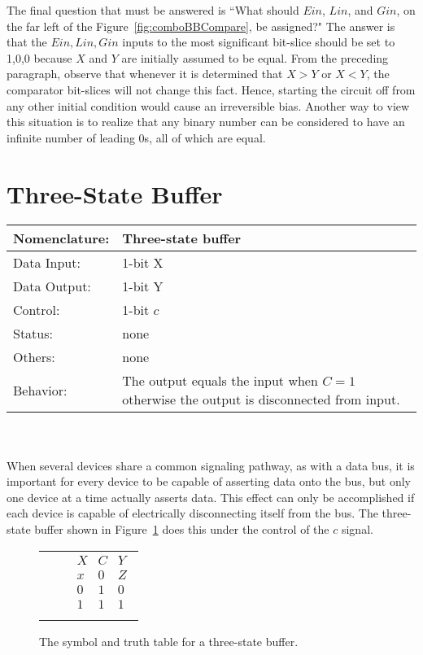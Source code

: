 The final question that must be answered is ``What should $Ein$, $Lin$,
and $Gin$, on the far left of the Figure~\ref{fig:comboBBCompare}, be assigned?"
The answer is that the $Ein, Lin,Gin$ inputs to the most significant bit-slice
should be set to 1,0,0 because $X$ and $Y$ are initially assumed to be equal.
From the preceding paragraph, observe that whenever it is determined
that $X>Y$ or $X<Y$, the comparator bit-slices will not change this 
fact.  Hence, starting the circuit off from any other initial condition
would cause an irreversible bias.  Another way to view this situation
is to realize that any binary number can be considered to have an infinite 
number of leading 0s, all of which are equal.

\section{Three-State Buffer}
\begin{tabular}{|l|p{3.5in}|} \hline
Nomenclature:  & Three-state buffer	\\ \hline
Data Input:    & 1-bit X		\\ \hline
Data Output:   & 1-bit Y		\\ \hline
Control:       & 1-bit $c$              \\ \hline
Status:        & none			\\ \hline
Others:        & none			\\ \hline
Behavior:      & The output equals the input when 
		$C=1$ otherwise the output is 
		disconnected from input. \\ \hline                                                                               
\end{tabular}
\label{page:tsb}
\\ \\
When several devices share a common signaling pathway, as with
a data bus, it is important for every device to be capable of 
asserting data onto the bus, but only one device at a time
actually asserts data.  This effect can only be accomplished if each
device is capable of electrically disconnecting itself from the
bus.  The three-state buffer shown in Figure~\ref{fig:comboBBtsb} does
this under the control of the $c$ signal.
                                                                                
\begin{figure}[ht]
\begin{tabular}[b]{p{1.0in}p{0.5in}l}
\includegraphics[10mm,10mm][12mm,12mm]{tsb} & &
                                                                                
$\begin{array}{c|c||c}
X & C & Y \\ \hline
x & 0 & Z \\ \hline
0 & 1 & 0 \\ \hline
1 & 1 & 1 \\
\end{array}$
\end{tabular}
\caption{The symbol and truth table for a three-state buffer.}
\label{fig:comboBBtsb}
\end{figure}

